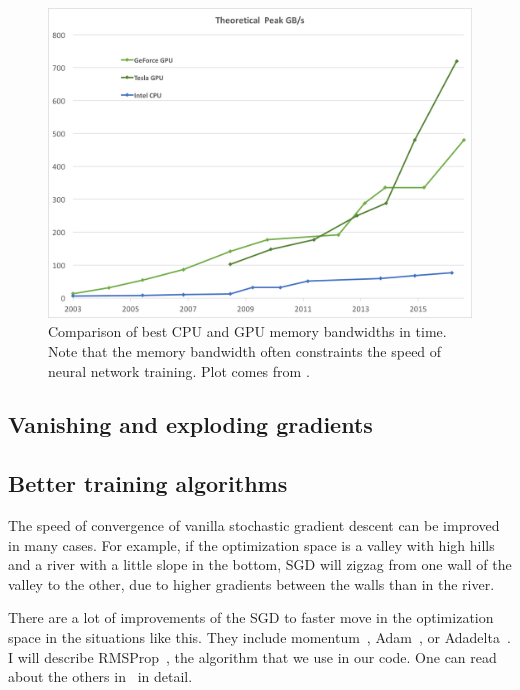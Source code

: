 \begin{figure}[h]
  \includegraphics[width=\linewidth]{images/gpu-bandwidth.png}
  \caption{Comparison of best CPU and GPU memory bandwidths in time. Note that the memory bandwidth often constraints the speed of neural network training. Plot comes from \cite{nvidia-docs}.}\label{nvidia-speed}
\end{figure}

\subsection{Vanishing and exploding gradients}

\subsection{Better training algorithms}
The speed of convergence of vanilla stochastic gradient descent can be improved in many cases. For example, if the optimization space is a valley with high hills and a river with a little slope in the bottom, SGD will zigzag from one wall of the valley to the other, due to higher gradients between the walls than in the river. 

There are a lot of improvements of the SGD to faster move in the optimization space in the situations like this. They include momentum~\cite{momentum}, Adam~\cite{adam}, or Adadelta~\cite{adadelta}. I will describe RMSProp~\cite{rmsprop}, the algorithm that we use in our code. One can read about the others in~\cite[chapter 8.3.]{dlbook} in detail.

